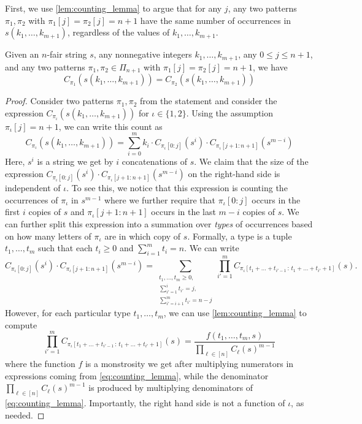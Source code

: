 \documentclass{article}
\begin{document}
First, we use \cref{lem:counting_lemma} to argue that for any $j$, any two patterns $\pi_1, \pi_2$ with $\pi_1[j] = \pi_2[j] = n+1$ have the same number of occurrences in $s(k_1, \dots, k_{m+1})$, regardless of the values of $k_1, \dots, k_{m+1}$. 
\begin{lemma}
    \label{lem:same_counts}
    Given an $n$-fair string $s$, any nonnegative integers $k_1, \dots, k_{m+1}$, any $0 \le j \le n+1$, and any two patterns $\pi_1, \pi_2 \in \Pi_{n+1}$ with $\pi_1[j] = \pi_2[j] = n+1$, we have 
    \[
    C_{\pi_1}(s(k_1, \dots, k_{m+1})) = C_{\pi_2}(s(k_1, \dots, k_{m+1}))
    \]
\end{lemma}
\begin{proof}
    Consider two patterns $\pi_1, \pi_2$ from the statement and consider the expression $C_{\pi_\iota}(s(k_1, \dots, k_{m+1}))$ for $\iota \in \{1,2\}$. Using the assumption $\pi_\iota[j] = n+1$, we can write this count as
    \[
    C_{\pi_\iota}(s(k_1, \dots, k_{m+1})) 
    = \sum_{i = 0}^{m} k_i \cdot C_{\pi_\iota[0:j]}(s^{i}) \cdot  C_{\pi_\iota[j+1:n+1]}(s^{m-i})
    \]
    Here, $s^i$ is a string we get by $i$ concatenations of $s$. 
    We claim that the size of the expression $C_{\pi_\iota[0:j]}(s^{i}) \cdot  C_{\pi_\iota[j+1:n+1]}(s^{m-i})$ on the right-hand side is independent of $\iota$. To see this, we notice that this expression is counting the occurrences of $\pi_\iota$ in $s^{m-1}$ where we further require that $\pi_{\iota}[0:j]$ occurs in the first $i$ copies of $s$ and $\pi_{\iota}[j+1:n+1]$ occurs in the last $m-i$ copies of $s$. 
    We can further split this expression into a summation over \emph{types} of occurrences based on how many letters of $\pi_\iota$ are in which copy of $s$. Formally, a type is a tuple $t_1, \dots, t_m$ such that each $t_i \ge 0$ and $\sum_{i = 1}^m t_i = n$. We can write
    \[
    C_{\pi_\iota[0:j]}(s^{i}) \cdot  C_{\pi_\iota[j+1:n+1]}(s^{m-i})
    = \sum_{\substack{t_1, \dots, t_{m} \ge 0, \\ \sum_{i' = 1}^{i} t_{i'} = j, \\ \sum_{i' = i+1}^{m} t_{i'} = n-j}} 
 \prod_{i' = 1}^{m} C_{\pi_\iota[t_1 + \dots + t_{i'-1} \,:\, t_1 + \dots + t_{i'} + 1]}(s).  
    \]
    However, for each particular type $t_1, \dots, t_{m}$, we can use \cref{lem:counting_lemma} to compute
    \[
     \prod_{i' = 1}^{m} C_{\pi_\iota[t_1 + \dots + t_{i'-1} \,:\, t_1 + \dots + t_{i'} + 1]}(s)  = \frac{f(t_1, \dots, t_{m}, s)}{\prod_{\ell \in [n]} C_\ell(s)^{m-1}}  
    \]
    where the function $f$ is a monstrosity we get after multiplying numerators in expressions coming from \cref{eq:counting_lemma}, while the denominator $\prod_{\ell \in [n]} C_\ell(s)^{m-1}$ is produced by multiplying denominators of \cref{eq:counting_lemma}. Importantly, the right hand side is not a function of $\iota$, as needed. 
\end{proof}
\end{document}
